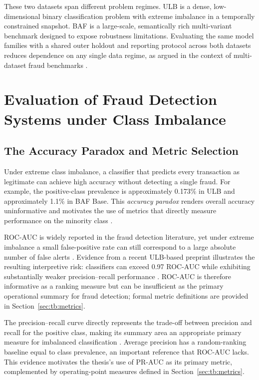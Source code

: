 These two datasets span different problem regimes. ULB is a dense, low-dimensional binary classification problem with extreme imbalance in a temporally constrained snapshot. BAF is a large-scale, semantically rich multi-variant benchmark designed to expose robustness limitations. Evaluating the same model families with a shared outer holdout and reporting protocol across both datasets reduces dependence on any single data regime, as argued in the context of multi-dataset fraud benchmarks \cite{grover2022fdb}.

\section{Evaluation of Fraud Detection Systems under Class Imbalance}
\label{subsec:fraud_detection_class_imbalance}

\subsection{The Accuracy Paradox and Metric Selection}
\label{subsec:sota-accuracy-paradox}

Under extreme class imbalance, a classifier that predicts every transaction as legitimate can achieve high accuracy without detecting a single fraud. For example, the positive-class prevalence is approximately 0.173\% in ULB and approximately 1.1\% in BAF Base. This \textit{accuracy paradox} renders overall accuracy uninformative and motivates the use of metrics that directly measure performance on the minority class \cite{hegarcia2009learning}.

ROC-AUC is widely reported in the fraud detection literature, yet under extreme imbalance a small false-positive rate can still correspond to a large absolute number of false alerts \cite{saito2015precision}. Evidence from a recent ULB-based preprint illustrates the resulting interpretive risk: classifiers can exceed 0.97 ROC-AUC while exhibiting substantially weaker precision--recall performance \cite{imani2026why}. ROC-AUC is therefore informative as a ranking measure but can be insufficient as the primary operational summary for fraud detection; formal metric definitions are provided in Section~\ref{sec:tb:metrics}.

The precision--recall curve directly represents the trade-off between precision and recall for the positive class, making its summary area an appropriate primary measure for imbalanced classification \cite{saito2015precision}. Average precision has a random-ranking baseline equal to class prevalence, an important reference that ROC-AUC lacks. This evidence motivates the thesis's use of PR-AUC as its primary metric, complemented by operating-point measures defined in Section~\ref{sec:tb:metrics}.


